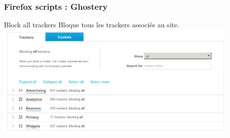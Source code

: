 \begin{frame}
\frametitle{Firefox scripts : Ghostery}
Block all trackers Bloque tous les trackers associés au site.\\
\includegraphics[width=0.9\textwidth]{./materials/ghostery}
\end{frame}

